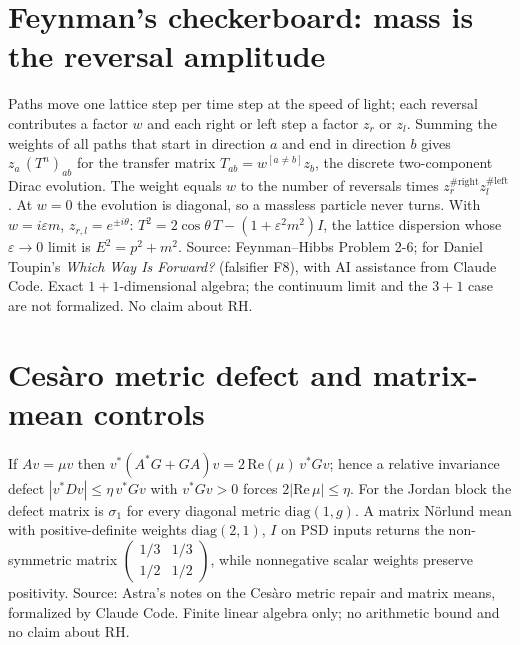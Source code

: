\documentclass{report}
\theoremstyle{definition}
\begin{document}
\begin{itemize}
\begin{itemize}
\section{Feynman's checkerboard: mass is the reversal amplitude}
Paths move one lattice step per time step at the speed of light; each reversal contributes a factor $w$ and each right or left step a
factor $z_r$ or $z_l$. Summing the weights of all paths that start in direction $a$ and end in direction $b$ gives $z_a\,(T^n)_{ab}$ for
the transfer matrix $T_{ab}=w^{[a\ne b]}z_b$, the discrete two-component Dirac evolution. The weight equals $w$ to the number of
reversals times $z_r^{\#\mathrm{right}}z_l^{\#\mathrm{left}}$. At $w=0$ the evolution is diagonal, so a massless particle never turns.
With $w=i\varepsilon m$, $z_{r,l}=e^{\pm i\theta}$: $T^2=2\cos\theta\,T-(1+\varepsilon^2m^2)I$, the lattice dispersion whose
$\varepsilon\to0$ limit is $E^2=p^2+m^2$. Source: Feynman--Hibbs Problem 2-6; for Daniel Toupin's \emph{Which Way Is Forward?}
(falsifier F8), with AI assistance from Claude Code. Exact $1+1$-dimensional algebra; the continuum limit and the $3+1$ case are not
formalized. No claim about RH.
\section{Ces\`aro metric defect and matrix-mean controls}
If $Av=\mu v$ then $v^*(A^*G+GA)v=2\,\mathrm{Re}(\mu)\,v^*Gv$; hence a relative invariance defect $|v^*Dv|\le\eta\,v^*Gv$ with $v^*Gv>0$
forces $2|\mathrm{Re}\,\mu|\le\eta$. For the Jordan block the defect matrix is $\sigma_1$ for every diagonal metric $\mathrm{diag}(1,g)$.
A matrix N\"orlund mean with positive-definite weights $\mathrm{diag}(2,1)$, $I$ on PSD inputs returns the non-symmetric matrix
$\begin{pmatrix}1/3&1/3\\1/2&1/2\end{pmatrix}$, while nonnegative scalar weights preserve positivity. Source: Astra's notes on the
Ces\`aro metric repair and matrix means, formalized by Claude Code. Finite linear algebra only; no arithmetic bound and no claim about RH.


\end{itemize}
\end{itemize}
\end{document}
